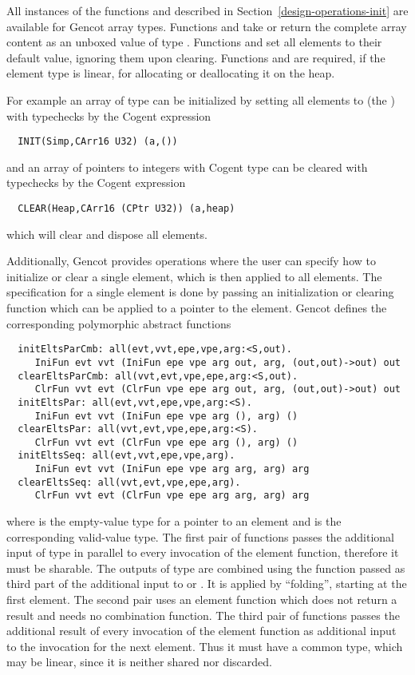 All instances of the functions  and  described in 
Section~\ref{design-operations-init} are available
for Gencot array types. Functions  and  take or return the complete array content
as an unboxed value of type . Functions  and  set all elements
to their default value, ignoring them upon clearing. Functions  and  
are required, if the element type is linear, for allocating or deallocating it on the heap.

For example an array  of type  can be initialized by setting all elements to  
(the ) with typechecks by the Cogent expression
\begin{verbatim}
  INIT(Simp,CArr16 U32) (a,())
\end{verbatim}
and an array  of pointers to integers with Cogent type  can be cleared with typechecks 
by the Cogent expression
\begin{verbatim}
  CLEAR(Heap,CArr16 (CPtr U32)) (a,heap)
\end{verbatim}
which will clear and dispose all elements.

Additionally, Gencot provides operations where the user can specify how to initialize or clear a single element, which is then
applied to all elements. The specification for a single element is done by passing an initialization or clearing function which
can be applied to a pointer to the element. Gencot defines the corresponding polymorphic abstract functions
\begin{verbatim}
  initEltsParCmb: all(evt,vvt,epe,vpe,arg:<S,out). 
     IniFun evt vvt (IniFun epe vpe arg out, arg, (out,out)->out) out
  clearEltsParCmb: all(vvt,evt,vpe,epe,arg:<S,out). 
     ClrFun vvt evt (ClrFun vpe epe arg out, arg, (out,out)->out) out
  initEltsPar: all(evt,vvt,epe,vpe,arg:<S). 
     IniFun evt vvt (IniFun epe vpe arg (), arg) ()
  clearEltsPar: all(vvt,evt,vpe,epe,arg:<S). 
     ClrFun vvt evt (ClrFun vpe epe arg (), arg) ()
  initEltsSeq: all(evt,vvt,epe,vpe,arg). 
     IniFun evt vvt (IniFun epe vpe arg arg, arg) arg
  clearEltsSeq: all(vvt,evt,vpe,epe,arg). 
     ClrFun vvt evt (ClrFun vpe epe arg arg, arg) arg
\end{verbatim}
where  is the empty-value type for a pointer to an element and  is the corresponding valid-value type.
The first pair of functions passes the additional input of type  in parallel to every invocation of the element function, 
therefore it must be sharable. The outputs of type  are combined using the function passed as third part of
the additional input to  or . It is applied by ``folding'', starting at the first element.
The second pair uses an element function which does not return a result and needs no combination function.
The third pair of functions passes the additional result of every invocation of the element function as additional input 
to the invocation for the next element. Thus it must have a common type, which may be linear, since it is neither shared nor
discarded. 

